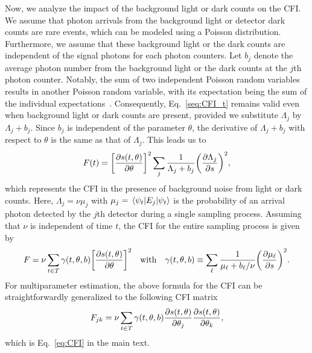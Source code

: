 \documentclass[aps,pra,10pt,showpacs,amsmath,amssymb,floatfix,superscriptaddress,twocolumn]{revtex4-2}
\begin{document}
Now, we analyze the impact of the background light or dark counts on the CFI.
We assume that photon arrivals from the background light or detector dark counts are rare events, which can be modeled using a Poisson distribution.
Furthermore, we assume that these background light or the dark counts are independent of the signal photons for each photon counters.
Let \(b_j\) denote the average photon number from the background light or the dark counts at the \( j \)th photon counter.
Notably, the sum of two independent Poisson random variables results in another Poisson random variable, with its expectation being the sum of the individual expectations~\cite{supp_Wasserman2010}.
Consequently, Eq.~\eqref{seq:CFI_t} remains valid even when background light or dark counts are present, provided we substitute \(\Lambda_j\) by \(\Lambda_j + b_j\).
Since \(b_j\) is independent of the parameter \(\theta\), the derivative of \(\Lambda_j + b_j\) with respect to \( \theta \) is the same as that of \(\Lambda_j\).
This leads us to
\begin{equation}
  F(t) = \qty[\pdv{s(t,\theta)}{\theta}]^2 \sum_j \frac{1}{\Lambda_j + b_j}\qty(\pdv{\Lambda_j}{s})^2,
\end{equation}
which represents the CFI in the presence of background noise from light or dark counts.
Here, \( \Lambda_j = \nu \mu_j \) with \( \mu_j = \ev{E_j}{\psi_t} \) is the probability of an arrival photon detected by the \( j \)th detector during a single sampling process.
Assuming that \( \nu \) is independent of time \( t \), the CFI for the entire sampling process is given by
\begin{equation}\label{seq:CFI}
  F = \nu \sum_{t\in T} \gamma(t, \theta, b) \qty[\pdv{s(t,\theta)}{\theta}]^2
  \qq{with}
  \gamma(t, \theta, b) \equiv \sum_\ell \frac{1}{\mu_\ell + b_\ell/\nu}\qty(\pdv{\mu_\ell}{s})^2.
\end{equation}
For multiparameter estimation, the above formula for the CFI can be straightforwardly generalized to the following CFI matrix
\begin{equation}\label{seq:CFIM}
  F_{jk}
  = \nu \sum_{t \in T} \gamma(t,\theta, b) \pdv{s(t,\theta)}{\theta_j}\pdv{s(t,\theta)}{\theta_k},
\end{equation}
which is Eq.~\eqref{eq:CFI} in the main text.
\end{document}

